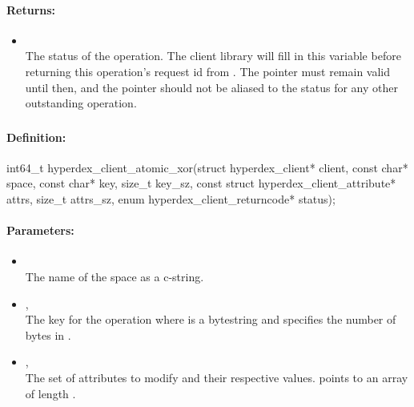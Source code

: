 \paragraph{Returns:}
\begin{itemize}[noitemsep]
\item {}\\
The status of the operation.  The client library will fill in this variable before returning this operation's request id from .  The pointer must remain valid until then, and the pointer should not be aliased to the status for any other outstanding operation.
\end{itemize}

\pagebreak
\subsubsection{}
\label{api:c:atomic_xor}


\paragraph{Definition:}
\begin{ccode}
int64_t hyperdex_client_atomic_xor(struct hyperdex_client* client,
        const char* space,
        const char* key, size_t key_sz,
        const struct hyperdex_client_attribute* attrs, size_t attrs_sz,
        enum hyperdex_client_returncode* status);
\end{ccode}

\paragraph{Parameters:}
\begin{itemize}[noitemsep]
\item {}\\
The name of the space as a c-string.
\item {}, \\
The key for the operation where  is a bytestring and  specifies the number of bytes in .
\item {}, \\
The set of attributes to modify and their respective values.   points to an array of length .
\end{itemize}

